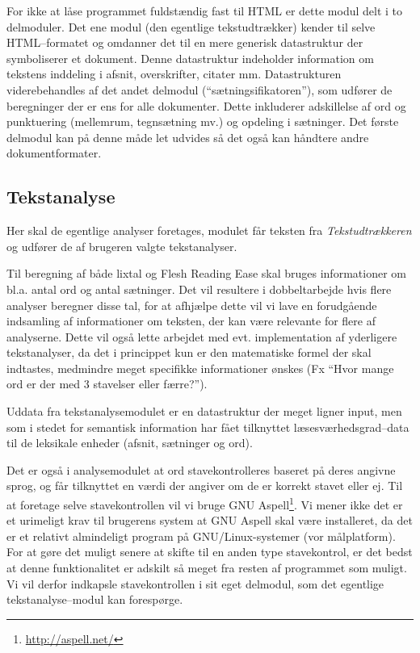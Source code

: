 \documentclass[a4paper,oneside,article]{memoir}
\begin{document}
For ikke at låse programmet fuldstændig fast til HTML er dette modul
delt i to delmoduler. Det ene modul (den egentlige tekstudtrækker)
kender til selve HTML--formatet og omdanner det til en mere generisk
datastruktur der symboliserer et dokument. Denne datastruktur
indeholder information om tekstens inddeling i afsnit, overskrifter,
citater mm. Datastrukturen viderebehandles af det andet delmodul
(``sætningsifikatoren''), som udfører de
beregninger der er ens for
alle dokumenter. Dette inkluderer adskillelse af ord og punktuering
(mellemrum, tegnsætning mv.) og opdeling i sætninger.  Det første
delmodul kan på denne måde let udvides så det også kan håndtere andre
dokumentformater.

\subsection{Tekstanalyse}
Her skal de egentlige analyser foretages, modulet får teksten fra
\textit{Tekstudtrækkeren} og udfører de af brugeren valgte
tekstanalyser.

Til beregning af både lixtal og Flesh Reading Ease skal bruges
informationer om bl.a. antal ord og antal sætninger. Det vil resultere
i dobbeltarbejde hvis flere analyser beregner disse tal, for at
afhjælpe dette vil vi lave en forudgående indsamling af informationer
om teksten, der kan være relevante for flere af analyserne. Dette vil
også lette arbejdet med evt. implementation af yderligere
tekstanalyser, da det i princippet kun er den matematiske formel der
skal indtastes, medmindre meget specifikke informationer ønskes
(Fx ``Hvor mange ord er der med 3 stavelser eller færre?'').

Uddata fra tekstanalysemodulet er en datastruktur der meget ligner
input, men som i stedet for semantisk information har fået tilknyttet
læsesværhedsgrad--data til de leksikale enheder (afsnit, sætninger og
ord).

Det er også i analysemodulet at ord stavekontrolleres baseret på deres
angivne sprog, og får tilknyttet en værdi der angiver om de er korrekt
stavet eller ej. Til at foretage selve stavekontrollen vil vi bruge
GNU Aspell\footnote{\url{http://aspell.net/}}. Vi mener ikke det er et
urimeligt krav til brugerens system at GNU Aspell skal være
installeret, da det er et relativt almindeligt program på
GNU/Linux-systemer (vor målplatform). For at gøre det muligt senere at
skifte til en anden type stavekontrol, er det bedst at denne
funktionalitet er adskilt så meget fra resten af programmet som
muligt. Vi vil derfor indkapsle stavekontrollen i sit eget delmodul,
som det egentlige tekstanalyse--modul kan forespørge.
\end{document}
